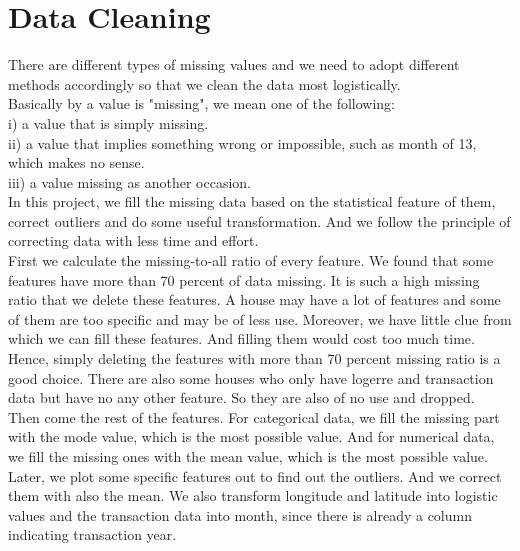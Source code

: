\documentclass[conference]{IEEEtran}
\begin{document}
\section{Data Cleaning}\label{iii}
\indent There are different types of missing values and we need to adopt different methods accordingly so that we clean the data most logistically. \\ Basically by a value is "missing", we mean one of the following: \\
i) a value that is simply missing. \\
ii) a value that implies something wrong or impossible, such as month of 13, which makes no sense. \\
iii) a value missing as another occasion. \\
\indent In this project, we fill the missing data based on the statistical feature of them, correct outliers and do some useful transformation. And we follow the principle of correcting data with less time and effort. \\
\indent First we calculate the missing-to-all ratio of every feature. We found that some features have more than 70 percent of data missing. It is such a high missing ratio that we delete these features. A house may have a lot of features and some of them are too specific and may be of less use. Moreover, we have little clue from which we can fill these features. And filling them would cost too much time. Hence, simply deleting the features with more than 70 percent missing ratio is a good choice. There are also some houses who only have logerre and transaction data but have no any other feature. So they are also of no use and dropped. \\
\indent Then come the rest of the features. For categorical data, we fill the missing part with the mode value, which is the most possible value. And for numerical data, we fill the missing ones with the mean value, which is the most possible value. \\
\indent Later, we plot some specific features out to find out the outliers. And we correct them with also the mean. We also transform longitude and latitude into logistic values and the transaction data into month, since there is already a column indicating transaction year. \\
%
\end{document}
